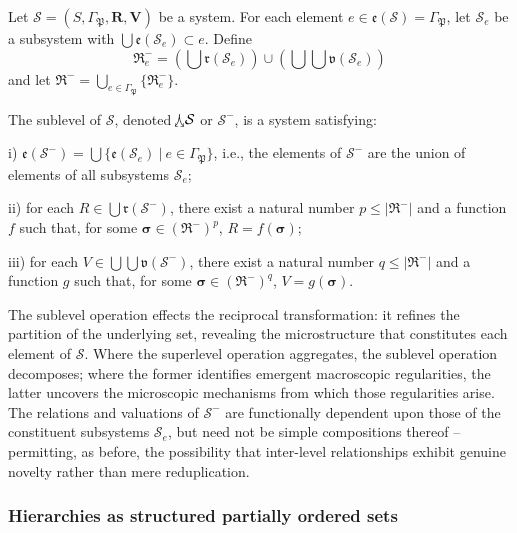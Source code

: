 \begin{definition} \label{def::sublevel_op}
Let $\mathcal{S} = (S, \Gamma_{\mathfrak{P}}, \mathbf{R}, \mathbf{V})$ be a system. For each element $e \in \mathfrak{e}(\mathcal{S}) = \Gamma_{\mathfrak{P}}$, let $\mathcal{S}_e$ be a subsystem with $\bigcup \mathfrak{e}(\mathcal{S}_e) \subset e$. Define
\[\mathfrak{R}_e^- = \left(\bigcup \mathfrak{r}(\mathcal{S}_e)\right) \cup \left(\bigcup \bigcup \mathfrak{v}(\mathcal{S}_e)\right)\]
and let $\mathfrak{R}^- = \bigcup_{e \in \Gamma_{\mathfrak{P}}} \{\mathfrak{R}_e^-\}$.

The sublevel of $\mathcal{S}$, denoted $\hspace{-0.88pt}{\curlywedgedownarrow^{}}{\mathcal{S}}$ or $\mathcal{S}^-$, is a system satisfying:

\noindent
i) $\mathfrak{e}(\mathcal{S}^-) = \bigcup \{\mathfrak{e}(\mathcal{S}_e) \ | \ e \in \Gamma_{\mathfrak{P}}\}$, i.e., the elements of $\mathcal{S}^-$ are the union of elements of all subsystems $\mathcal{S}_e$;

\noindent
ii) for each $R \in \bigcup \mathfrak{r}(\mathcal{S}^-)$, there exist a natural number $p \leq |\mathfrak{R}^-|$ and a function $f$ such that, for some $\boldsymbol{\sigma} \in (\mathfrak{R}^-)^p$, $R = f(\boldsymbol{\sigma})$;

\noindent
iii) for each $V \in \bigcup \bigcup \mathfrak{v}(\mathcal{S}^-)$, there exist a natural number $q \leq |\mathfrak{R}^-|$ and a function $g$ such that, for some $\boldsymbol{\sigma} \in (\mathfrak{R}^-)^q$, $V = g(\boldsymbol{\sigma})$.
\end{definition}

The sublevel operation effects the reciprocal transformation: it refines the partition of the underlying set, revealing the microstructure that constitutes each element of $\mathcal{S}$. Where the superlevel operation aggregates, the sublevel operation decomposes; where the former identifies emergent macroscopic regularities, the latter uncovers the microscopic mechanisms from which those regularities arise. The relations and valuations of $\mathcal{S}^-$ are functionally dependent upon those of the constituent subsystems $\mathcal{S}_e$, but need not be simple compositions thereof -- permitting, as before, the possibility that inter-level relationships exhibit genuine novelty rather than mere reduplication.

\subsubsection{Hierarchies as structured partially ordered sets}

